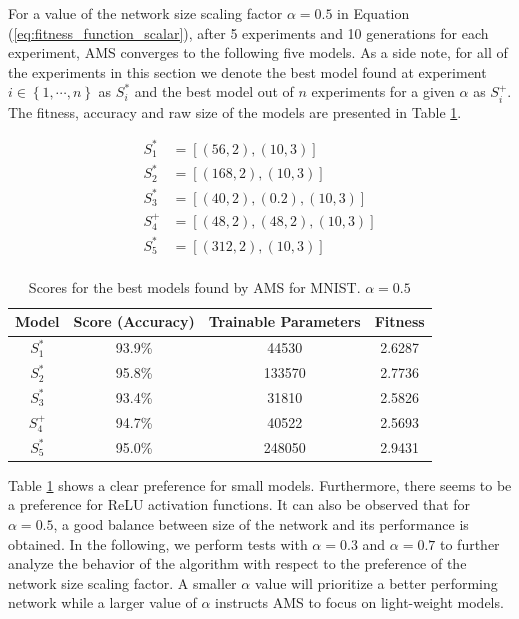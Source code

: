 \documentclass[preprint,12pt]{elsarticle}%
\begin{document}
For a value of the network size scaling factor $\alpha = 0.5$ in Equation (\ref{eq:fitness_function_scalar}), after 5 experiments and 10 generations for each experiment, AMS converges to the following five models. As a side note, for all of the experiments in this section we denote the best model found at experiment $i \in \left\lbrace 1, \cdots, n \right\rbrace$ as $S_i^*$ and the best model out of $n$ experiments for a given $\alpha$ as $S_i^+$. The fitness, accuracy and raw size of the models are presented in Table \ref{table:ams_mnist_1}.

\begin{align*}
S^*_1 & = \left[ (56, 2), (10, 3) \right] \\
S^*_2 & = \left[ (168, 2), (10, 3) \right] \\
S^*_3 & = \left[ (40, 2), (0.2), (10, 3) \right] \\
S^+_4& = \left[ (48, 2), (48, 2),  (10, 3) \right] \\
S^*_5 & = \left[ (312, 2), (10, 3) \right] \\
\end{align*}

\vspace{-2em}

\begin{table}[H]
\begin{center}
\begin{tabular}{| c | c | c | c |}
\hline
Model & Score (Accuracy) & Trainable Parameters & Fitness\\
\hline
$S^*_1$ & 93.9\% & 44530 & 2.6287\\
$S^*_2$ & 95.8\% & 133570 & 2.7736\\
$S^*_3$ & 93.4\% & 31810 & 2.5826\\
$S^+_4$ & 94.7\% & 40522 & 2.5693\\
$S^*_5$ & 95.0\% & 248050 & 2.9431\\
\hline
\end{tabular}
\end{center}
\caption{Scores for the best models found by AMS for MNIST. $\alpha = 0.5$}
\label{table:ams_mnist_1}
\end{table}

Table \ref{table:ams_mnist_1} shows a clear preference for small models. Furthermore, there seems to be a preference for ReLU activation functions. It can also be observed that for $\alpha = 0.5$, a good balance between size of the network and its performance is obtained. In the following, we perform tests with $\alpha = 0.3$ and $\alpha = 0.7$ to further analyze the behavior of the algorithm with respect to the preference of the network size scaling factor. A smaller $\alpha$ value will prioritize a better performing network while a larger value of $\alpha$ instructs AMS to focus on light-weight models.
\end{document}

